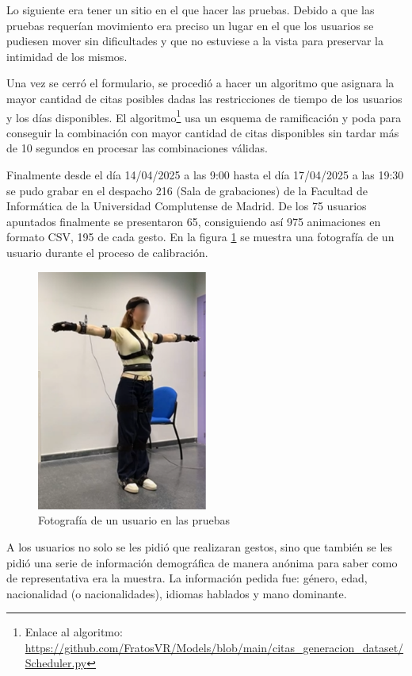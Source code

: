 Lo siguiente era tener un sitio en el que hacer las pruebas. Debido a que las pruebas requerían movimiento era preciso un lugar en el que los usuarios se pudiesen mover sin dificultades y que no estuviese a la vista para preservar la intimidad de los mismos.

Una vez se cerró el formulario, se procedió a hacer un algoritmo que asignara la mayor cantidad de citas posibles dadas las restricciones de tiempo de los usuarios y los días disponibles. El algoritmo\footnote{Enlace al algoritmo: \url{https://github.com/FratosVR/Models/blob/main/citas_generacion_dataset/Scheduler.py}} usa un esquema de ramificación y poda para conseguir la combinación con mayor cantidad de citas disponibles sin tardar más de 10 segundos en procesar las combinaciones válidas.

Finalmente desde el día 14/04/2025 a las 9:00 hasta el día 17/04/2025 a las 19:30 se pudo grabar en el despacho 216 (Sala de grabaciones) de la Facultad de Informática de la Universidad Complutense de Madrid.
De los 75 usuarios apuntados finalmente se presentaron 65, consiguiendo así 975 animaciones en formato CSV, 195 de cada gesto. En la figura \ref{fig:PruebasLidia} se muestra una fotografía de un usuario durante el proceso de calibración.

\begin{figure}[H]
	\centering
	\includegraphics[width=0.5\textwidth]{Imagenes/Vectorial/LidiaPruebasBlurr.pdf}
	\caption{Fotografía de un usuario en las pruebas}
	\label{fig:PruebasLidia}
\end{figure}

A los usuarios no solo se les pidió que realizaran gestos, sino que también se les pidió una serie de información demográfica de manera anónima para saber como de representativa era la muestra. La información pedida fue: género, edad, nacionalidad (o nacionalidades), idiomas hablados y mano dominante.

